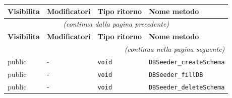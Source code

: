 \begin{longtable}{@{}llll@{}}
\toprule
\textbf{Visibilita} & \textbf{Modificatori} & \textbf{Tipo ritorno} & \textbf{Nome metodo} \\
\midrule
\endfirsthead
\multicolumn{4}{c}{\small\itshape (continua dalla pagina precedente)} \\
\toprule
\textbf{Visibilita} & \textbf{Modificatori} & \textbf{Tipo ritorno} & \textbf{Nome metodo} \\
\midrule
\endhead
\midrule
\multicolumn{4}{r}{\small\itshape (continua nella pagina seguente)} \\
\endfoot
\bottomrule
\endlastfoot
  public & - & \texttt{void} & \texttt{DBSeeder\_createSchema} \\
  public & - & \texttt{void} & \texttt{DBSeeder\_fillDB} \\
  public & - & \texttt{void} & \texttt{DBSeeder\_deleteSchema} \\
\end{longtable}

